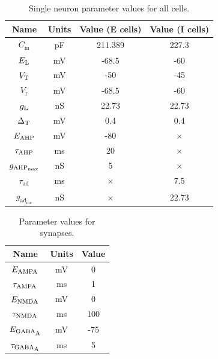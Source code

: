 \documentclass[a4paper,12pt]{article}
\newcommand{\ssc}[3]{\ensuremath{#1_{\text{#2}_{\text{#3}}}}}
\newcommand{\Cm}       {\ssc{C}      {m}     {}}
\newcommand{\gL}       {\ssc{g}      {\scriptsize{L}}  {}}
\newcommand{\EL}       {\ssc{E}      {\scriptsize{L}}  {}}
\newcommand{\gAHPmax}  {\ssc{g}      {\scriptsize{AHP}}{max}}
\newcommand{\EAHP}     {\ssc{E}      {\scriptsize{AHP}}{}}
\newcommand{\tauAHP}   {\ssc{\tau}   {\scriptsize{AHP}}{}}
\newcommand{\VT}       {\ssc{V}      {\scriptsize{T}}  {}}
\newcommand{\Vr}       {\ssc{V}      {r}     {}}
\newcommand{\EGABAA}   {\ssc{E}      {\scriptsize{GABA}}{\scriptsize{A}}}
\newcommand{\tauGABAA} {\ssc{\tau}   {\scriptsize{GABA}}{\scriptsize{A}}}
\newcommand{\EAMPA}    {\ssc{E}      {\scriptsize{AMPA}}{}}
\newcommand{\tauAMPA}  {\ssc{\tau}   {\scriptsize{AMPA}}{}}
\newcommand{\ENMDA}    {\ssc{E}      {\scriptsize{NMDA}}{}}
\newcommand{\tauNMDA}  {\ssc{\tau}   {\scriptsize{NMDA}}{}}
\newcommand{\tauad}    {\ssc{\tau}   {ad}{}}
\newcommand{\gadinc}   {\ssc{g}      {ad}{inc}}
\newcommand{\deltaT}   {\ssc{\Delta} {\scriptsize{T}}{}}
\begin{document}
\begin{table}
    \internallinenumbers
    \centering
    \begin{tabular}{| c | c | c | c |}
        \hline
        Name       & Units & Value (E cells) & Value (I cells) \\
        \hline\hline
        $\Cm$      & pF    & 211.389         & 227.3    \\
        $\EL$      & mV    & -68.5           & -60      \\
        $\VT$      & mV    & -50             & -45      \\
        $\Vr$      & mV    & -68.5           & -60      \\
        $\gL$      & nS    & 22.73           & 22.73    \\
        $\deltaT$  & mV    & 0.4             & 0.4      \\
        $\EAHP$    & mV    & -80             & $\times$ \\
        $\tauAHP$  & ms    & 20              & $\times$ \\
        $\gAHPmax$ & nS    & 5               & $\times$ \\
        $\tauad$   & ms    & $\times$        & 7.5      \\
        $\gadinc$  & nS    & $\times$        & 22.73    \\
        \hline
    \end{tabular}
    \caption{Single neuron parameter values for all cells.}
    \label{tab:params_E}
\end{table}

\begin{table}
    \internallinenumbers
    \centering
    \begin{tabular}{| c | c | c |}
        \hline
        Name       & Units & Value \\
        \hline\hline
        $\EAMPA$   & mV    & 0     \\
        $\tauAMPA$ & ms    & 1     \\
        $\ENMDA$   & mV    & 0     \\
        $\tauNMDA$ & ms    & 100   \\
        $\EGABAA$  & mV    & -75   \\
        $\tauGABAA$& ms    & 5     \\
        \hline
    \end{tabular}
    \caption{Parameter values for synapses.}
    \label{tab:params_synapses}
\end{table}
\end{document}
